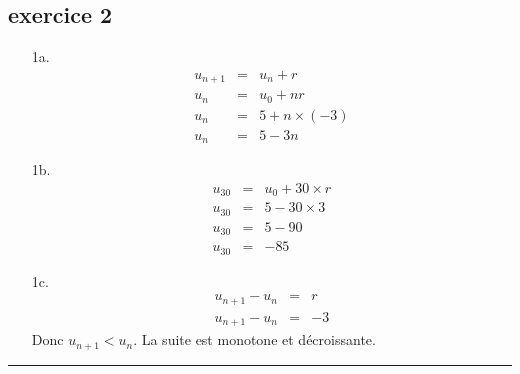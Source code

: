 \documentclass[11pt]{article}
\newcommand{\horrule}[1]{\rule{\linewidth}{#1}} %
\begin{document}
\newpage

\begin{multicols}{2}
  \section{exercice 2}
  
  \begin{enumerate}
  \item[1a.] 
    \begin{eqnarray*}
      u_{n+1} &=& u_n + r \\
      u_n &=& u_0 + nr \\
      u_n &=& 5 + n \times (-3)\\
      u_n &=& 5 - 3n 
    \end{eqnarray*}
    
  \item[1b.] 
    \begin{eqnarray*}
      u_{30} &=& u_0 + 30 \times r \\
      u_{30} &=& 5 - 30 \times 3\\
      u_{30} &=& 5 - 90\\
      u_{30} &=& -85 
    \end{eqnarray*}
    
  \item[1c.] 
    \begin{eqnarray*}
      u_{n+1} - u_n &=& r \\
      u_{n+1} - u_n &=& -3
    \end{eqnarray*}
    Donc $u_{n+1} < u_n$. La suite est monotone et décroissante.
  \end{enumerate}
\end{multicols}
\horrule{1px}
\end{document}
